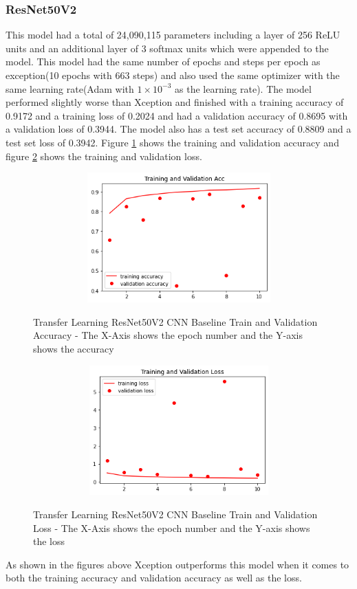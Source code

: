 \subsubsection{ResNet50V2}
This model had a total of 24,090,115 parameters including a layer of 256 ReLU units and an additional layer of 3 softmax units which were appended to the model.  This model had the same number of epochs and steps per epoch as exception(10 epochs with 663 steps) and also used the same optimizer with the same learning rate(Adam with $1\times10^{-3}$ as the learning rate).  The model performed slightly worse than Xception and finished with a training accuracy of 0.9172 and a training loss of 0.2024 and had a validation accuracy of 0.8695 with a validation loss of 0.3944.  The model also has a test set accuracy of 0.8809 and a test set loss of 0.3942.  Figure \ref{fig:Transfer Learning ResNet50V2 CNN Baseline Train and Validation Accuracy Radiography} shows the training and validation accuracy and figure \ref{fig:Transfer Learning ResNet50V2 CNN Baseline Train and Validation Loss Radiography} shows the training and validation loss. 
 \begin{figure}[H]
    \centering
    \includegraphics[width=1\textwidth,height=5cm,keepaspectratio]{Images/ResNet50V2BaselineTrainingValidationAccRadiography.png}\\
    \caption{Transfer Learning ResNet50V2 CNN Baseline Train and Validation Accuracy - The X-Axis shows the epoch number and the Y-axis shows the accuracy}
    \label{fig:Transfer Learning ResNet50V2 CNN Baseline Train and Validation Accuracy Radiography}
\end{figure}
 \begin{figure}[H]
    \centering
    \includegraphics[width=1\textwidth,height=5cm,keepaspectratio]{Images/ResNet50V2BaselineTrainingValidationLossRadiography.png}\\
    \caption{Transfer Learning ResNet50V2 CNN Baseline Train and Validation Loss  - The X-Axis shows the epoch number and the Y-axis shows the loss}
    \label{fig:Transfer Learning ResNet50V2 CNN Baseline Train and Validation Loss Radiography}
\end{figure}
As shown in the figures above Xception outperforms this model when it comes to both the training accuracy and validation accuracy as well as the loss.
